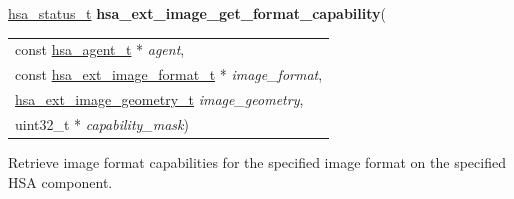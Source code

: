 \documentclass[final]{book}
\newcommand{\hsaarg}[1]{\textit{#1}}
\begin{document}
\noindent\begin{tcolorbox}[breakable,nobeforeafter,colframe=white,colback=lightgray,left=0mm]
\hyperlink{group__status_1gad755322e7ff95456520e8abdbe90d225}{hsa_status_t} \hypertarget{group__images_1gac40dc77fcbc5711552cba2e3631181fd}{\textbf{hsa_ext_image_get_format_capability}}(
\vspace{-3.5mm}\begin{longtable}{@{}p{\textwidth}}
\hspace{1.7em}const \hyperlink{group__topology_1gab8db3fb886332a24acac08ec361e1d86}{hsa_agent_t} * \hsaarg{agent},\\
\hspace{1.7em}const \hyperlink{group__images_1gaeaafb5fb8c9a7d88973e05f0b11c239d}{hsa_ext_image_format_t} * \hsaarg{image_format},\\
\hspace{1.7em}\hyperlink{group__images_1gac61587d98a80d1660378e3904a66fc9c}{hsa_ext_image_geometry_t} \hsaarg{image_geometry},\\
\hspace{1.7em}uint32_t * \hsaarg{capability_mask})\end{longtable}

\end{tcolorbox}
Retrieve image format capabilities for the specified image format on the specified HSA component.
\end{document}
